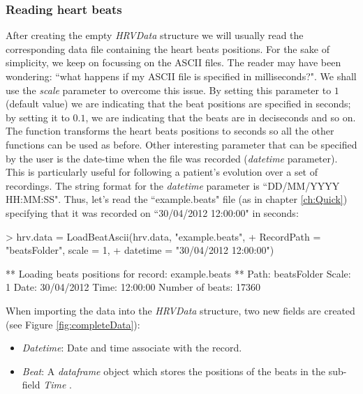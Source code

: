 \documentclass[12pt,lot, lof]{puthesis}
\begin{document}
\subsubsection{Reading heart beats\label{sec:moreReading}} After creating the 
empty \textit{HRVData} structure  we will usually read the corresponding data 
file containing the heart beats positions. For the sake of simplicity, we keep 
on focussing on the ASCII files. The reader may have been wondering: ``what 
happens if my ASCII file is specified in milliseconds?". We shall use the  
\textit{scale} parameter to overcome this issue. By setting this parameter to 
$1$ (default value) we are indicating that the beat positions are specified in 
seconds; by setting it to $0.1$, we are indicating that the beats are in 
deciseconds and so on. The function transforms the heart beats positions to 
seconds so all the other functions can be used as before. Other interesting 
parameter that can be specified by the user is the date-time when the file was 
recorded (\textit{datetime} parameter). This is particularly useful for 
following a patient's evolution over a set of recordings. The string format for 
the \textit{datetime} parameter is ``DD/MM/YYYY HH:MM:SS". Thus, let's read the 
``example.beats" file (as in chapter \ref{ch:Quick}) specifying that  it was 
recorded on ``30/04/2012 12:00:00" in seconds:

\begin{Schunk}
\begin{Sinput}
> hrv.data = LoadBeatAscii(hrv.data, "example.beats",
+        RecordPath = "beatsFolder", scale = 1, 
+ 		   datetime = "30/04/2012 12:00:00")
\end{Sinput}
\begin{Soutput}
** Loading beats positions for record: example.beats **
   Path: beatsFolder 
   Scale: 1 
   Date: 30/04/2012
   Time: 12:00:00
   Number of beats: 17360 
\end{Soutput}
\end{Schunk}

When importing the data into the \textit{HRVData} structure, two new fields are 
created (see Figure \ref{fig:completeData}):
\begin{itemize}
\item \textit{Datetime}: Date and time associate with the record.
\item \textit{Beat}: A \textit{dataframe} object which stores the positions of 
the beats in the sub-field \textit{Time} .
\end{itemize}
\end{document}
